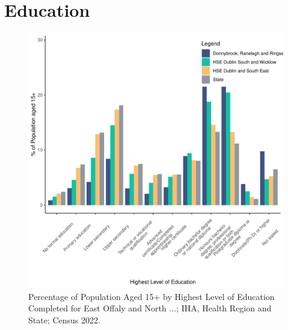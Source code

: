 \documentclass{article}
\begin{document}
\section{Education}\label{sect:Edu}
\begin{figure}[H]
	\centering
	\includegraphics[width = 120mm]{../figures/EduED.pdf}
	\caption{Percentage of Population Aged 15+ by Highest Level of Education Completed for East Offaly and North ...; IHA, Health Region and State; Census 2022.}
	\label{fig:vbnv}
	\end{figure}
\end{document}
